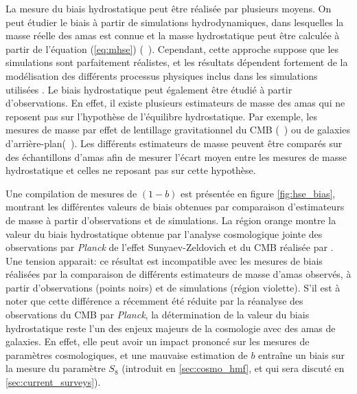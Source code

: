 La mesure du biais hydrostatique peut être réalisée par plusieurs moyens.
On peut étudier le biais à partir de simulations hydrodynamiques, dans lesquelles la masse réelle des amas est connue et la masse hydrostatique peut être calculée à partir de l'équation (\ref{eq:mhse}) (\eg\ \cite{barnes_characterizing_2021,gianfagna_exploring_2021}).
Cependant, cette approche suppose que les simulations sont parfaitement réalistes, et les résultats dépendent fortement de la modélisation des différents processus physiques inclus dans les simulations utilisées \cite{gianfagna_exploring_2021}.
Le biais hydrostatique peut également être étudié à partir d'observations.
En effet, il existe plusieurs estimateurs de masse des amas qui ne reposent pas sur l'hypothèse de l'équilibre hydrostatique.
Par exemple, les mesures de masse par effet de lentillage gravitationnel du CMB (\eg\ \cite{madhavacheril_atacama_2020, louis_calibrating_2017, zubeldia_cosmological_2019}) ou de galaxies d'arrière-plan\footnotemark (\eg\ \cite{sereno_comparing_2015}).
Les différents estimateurs de masse peuvent être comparés sur des échantillons d'amas afin de mesurer l'écart moyen entre les mesures de masse hydrostatique et celles ne reposant pas sur cette hypothèse.

Une compilation de mesures de $(1-b)$ est présentée en figure \ref{fig:hse_bias}, montrant les différentes valeurs de biais obtenues par comparaison d'estimateurs de masse à partir d'observations et de simulations.
La région orange montre la valeur du biais hydrostatique obtenue par l'analyse cosmologique jointe des observations par \textit{Planck} de l'effet Sunyaev-Zeldovich et du CMB réalisée par .
Une tension apparait: ce résultat est incompatible avec les mesures de biais réalisées par la comparaison de différents estimateurs de masse d'amas observés, à partir d'observations (points noirs) et de simulations (région violette).
S'il est à noter que cette différence a récemment été réduite par la réanalyse des observations du CMB par \textit{Planck}\footnotemark, la détermination de la valeur du biais hydrostatique reste l'un des enjeux majeurs de la cosmologie avec des amas de galaxies.
En effet, elle peut avoir un impact prononcé sur les mesures de paramètres cosmologiques, et une mauvaise estimation de $b$ entraîne un biais sur la mesure du paramètre $S_8$ (introduit en \ref{sec:cosmo_hmf}, et qui sera discuté en \ref{sec:current_surveys}).

